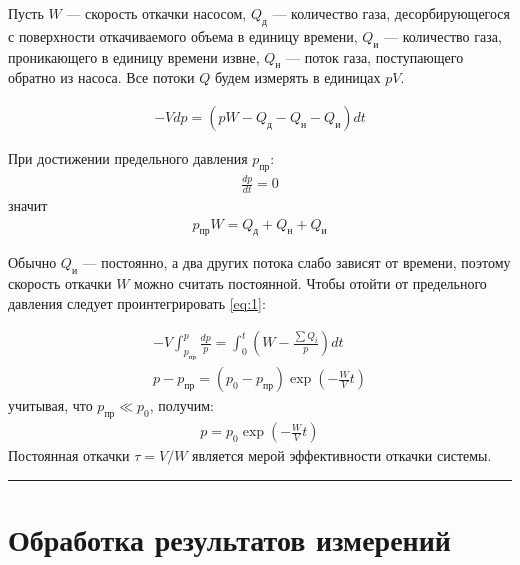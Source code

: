 \documentclass[a4paper,12pt]{report}
\begin{document}
    \begin{multicols}{2}
        Пусть $W$ --- скорость откачки насосом, $Q_\text{д}$ --- количество газа, десорбирующегося с поверхности откачиваемого объема в единицу времени, $Q_\text{и}$ --- количество газа, проникающего в единицу времени извне, $Q_\text{н}$ --- поток газа, поступающего обратно из насоса. Все потоки $Q$ будем измерять в единицах $pV$.

        \begin{gather}
            -Vdp=(pW-Q_\text{д}-Q_\text{н}-Q_\text{и})dt \label{eq:1}
        \end{gather}

        При достижении предельного давления $p_\text{пр}$:
        \begin{gather*}
            \frac{dp}{dt}=0
        \end{gather*}
        значит
        \begin{gather}
            p_\text{пр}W=Q_\text{д}+Q_\text{н}+Q_\text{и}
        \end{gather}

        Обычно $Q_\text{и}$ --- постоянно, а два других потока слабо зависят от времени, поэтому скорость откачки $W$ можно считать постоянной. Чтобы отойти от предельного давления следует проинтегрировать \eqref{eq:1}:

        \begin{gather*}
            -V\int_{p_\text{пр}}^{p}\frac{dp}{p}=\int_{0}^{t}\left(W-\frac{\sum Q_i}{p}\right)dt \\
            p-p_\text{пр}=(p_0-p_\text{пр})\exp{\left(-\frac{W}{V}t\right)}
        \end{gather*}
        учитывая, что $p_\text{пр}\ll p_0$, получим:
        \begin{gather}
            p=p_0\exp{\left(-\frac{W}{V}t\right)}
        \end{gather}
        Постоянная откачки $\tau=V/W$ является мерой эффективности откачки системы.

    \end{multicols}

    \hrule

    \section{Обработка результатов измерений}

    \begin{multicols}{2}
        
    \end{multicols}
\end{document}
